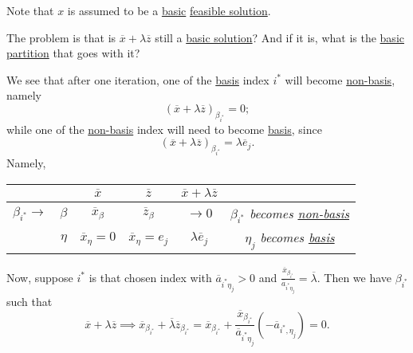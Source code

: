 \begin{remark}
	Note that \(x\) is assumed to be a \hyperref[def:basic-solution]{basic} \hyperref[def:feasible-solution]{feasible solution}.
\end{remark}
\begin{problem*}
	The problem is that is \(\overline{x}+\lambda \overline{z}\) still a \hyperref[def:basic-solution]{basic solution}? And if it is, what is the \hyperref[def:basic-partition]{basic partition}
	that goes with it?
\end{problem*}
\begin{answer}
	We see that after one iteration, one of the \hyperref[def:basis]{basis} index \(i^{\ast}\) will become \hyperref[def:non-basis]{non-basis}, namely
	\[
		(\overline{x} + \lambda \overline{z})_{\beta_{i^{\ast}}} = 0;
	\]
	while one of the \hyperref[def:non-basis]{non-basis} index will need to become \hyperref[def:basis]{basis}, since
	\[
		(\overline{x} + \lambda \overline{z})_{\beta_{i^{\ast}}} = \lambda \overline{e}_j.
	\]
	Namely,
	\begin{table}[H]
		\centering
		\begin{tabular}{cc|c|c|cc}
			\toprule
			                          &           & \(\overline{x}\)            & \(\overline{z}\)                & \(\overline{x} + \lambda \overline{z}\) &                                                                         \\
			\midrule
			\(\beta_{i^{\ast}} \to \) & \(\beta\) & \(\overline{x}_{\beta}\)    & \(\overline{z}_{\beta}\)        & \(\to 0\)                               & \emph{\(\beta_{i^{\ast}}\) becomes \hyperref[def:non-basis]{non-basis}} \\\hline
			                          & \(\eta\)  & \(\overline{x}_{\eta} = 0\) & \(\overline{x}_{\eta} = e_{j}\) & \(\lambda \overline{e}_j\)              & \emph{\(\eta_{j}\) becomes \hyperref[def:basis]{basis}}                 \\
			\bottomrule
		\end{tabular}
	\end{table}
\end{answer}

Now, suppose \(i^{\ast}\) is that chosen index with \(\overline{a}_{i^{\ast} \eta_{j}}>0\) and \(\frac{\overline{x}_{\beta_{i^{\ast}}}}{\overline{a}_{i^{\ast} \eta_{j}}} = \overline{\lambda}\). Then we have \(\beta_{i^{\ast}}\) such that
\[
	\overline{x} + \lambda \overline{z} \implies \overline{x}_{\beta_{i^{\ast}}} + \overline{\lambda} \overline{z}_{\beta_{i^{\ast}}} = \overline{x}_{\beta_{i^{\ast}}}+\frac{\overline{x}_{\beta_{i^{\ast}}}}{\overline{a}_{i^{\ast} \eta_{j}}}\left( -\overline{a}_{i^{\ast}, \eta_{j}} \right) = 0.
\]


